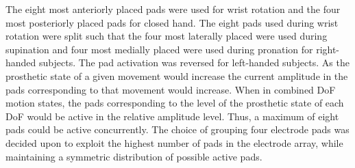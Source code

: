 The eight most anteriorly placed pads were used for wrist rotation and the four most posteriorly placed pads for closed hand. The eight pads used during wrist rotation were split such that the four most laterally placed were used during supination and four most medially placed were used during pronation for right-handed subjects. The pad activation was reversed for left-handed subjects. As the prosthetic state of a given movement would increase the current amplitude in the pads corresponding to that movement would increase. When in combined DoF motion states, the pads corresponding to the level of the prosthetic state of each DoF would be active in the relative amplitude level. Thus, a maximum of eight pads could be active concurrently. The choice of grouping four electrode pads was decided upon to exploit the highest number of pads in the electrode array, while maintaining a symmetric distribution of possible active pads.



